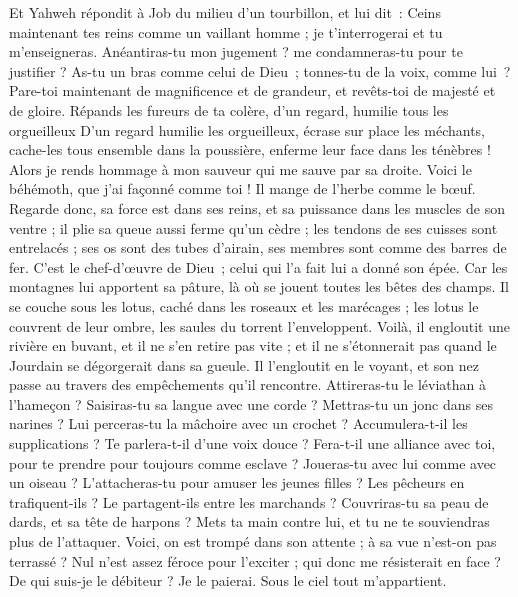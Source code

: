 \begin{multicols}{2}
\VerseOne{}Et Yahweh répondit à Job du milieu d'un tourbillon, et lui dit :
Ceins maintenant tes reins comme un vaillant homme ; je t'interrogerai et tu m'enseigneras.
Anéantiras-tu mon jugement ? me condamneras-tu pour te justifier ?
As-tu un bras comme celui de Dieu ; tonnes-tu de la voix, comme lui ?
Pare-toi maintenant de magnificence et de grandeur, et revêts-toi de majesté et de gloire.
Répands les fureurs de ta colère, d'un regard, humilie tous les orgueilleux
D'un regard humilie les orgueilleux, écrase sur place les méchants,
cache-les tous ensemble dans la poussière, enferme leur face dans les ténèbres !
Alors je rends hommage à mon sauveur qui me sauve par sa droite.
Voici le béhémoth, que j'ai façonné comme toi ! Il mange de l'herbe comme le bœuf.
Regarde donc, sa force est dans ses reins, et sa puissance dans les muscles de son ventre ;
il plie sa queue aussi ferme qu'un cèdre ; les tendons de ses cuisses sont entrelacés ;
ses os sont des tubes d'airain, ses membres sont comme des barres de fer.
C’est le chef-d’œuvre de Dieu ; celui qui l’a fait lui a donné son épée.
Car les montagnes lui apportent sa pâture, là où se jouent toutes les bêtes des champs.
Il se couche sous les lotus, caché dans les roseaux et les marécages ;
les lotus le couvrent de leur ombre, les saules du torrent l'enveloppent.
Voilà, il engloutit une rivière en buvant, et il ne s'en retire pas vite ; et il ne s'étonnerait pas quand le Jourdain se dégorgerait dans sa gueule. 
Il l'engloutit en le voyant, et son nez passe au travers des empêchements qu'il rencontre.  
Attireras-tu le léviathan à l'hameçon ? Saisiras-tu sa langue avec une corde ?
Mettras-tu un jonc dans ses narines ? Lui perceras-tu la mâchoire avec un crochet ?
Accumulera-t-il les supplications ? Te parlera-t-il d'une voix douce ?
Fera-t-il une alliance avec toi, pour te prendre pour toujours comme esclave ?
Joueras-tu avec lui comme avec un oiseau ? L'attacheras-tu pour amuser les jeunes filles ?
Les pêcheurs en trafiquent-ils ? Le partagent-ils entre les marchands ?
Couvriras-tu sa peau de dards, et sa tête de harpons ?
Mets ta main contre lui, et tu ne te souviendras plus de l'attaquer.
Voici, on est trompé dans son attente ; à sa vue n'est-on pas terrassé ?
\VerseOne{}Nul n'est assez féroce pour l'exciter ; qui donc me résisterait en face ?
De qui suis-je le débiteur ? Je le paierai. Sous le ciel tout m'appartient.

\end{multicols}
